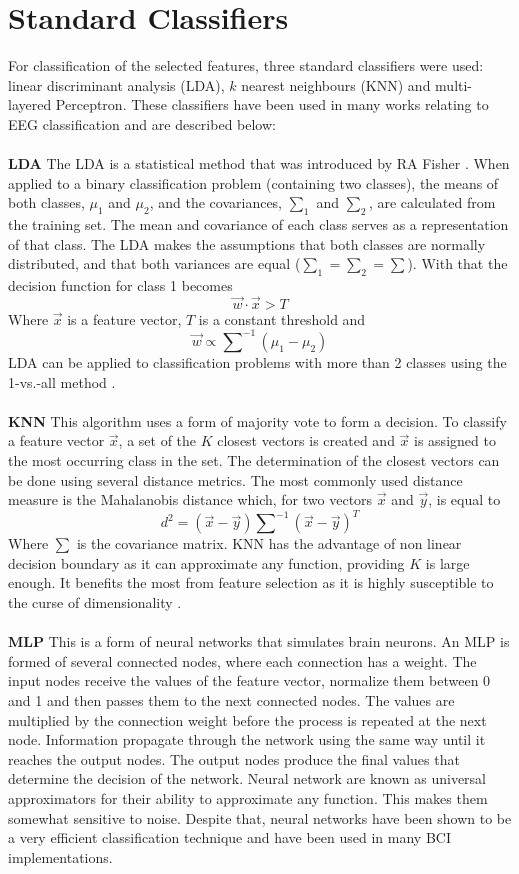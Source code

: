 \documentclass[12pt, a4paper, fleqn]{memoir}%
\begin{document}
\section{Standard Classifiers}
\label{sec:StandardClassifiers}
For classification of the selected features, three standard classifiers were used: linear discriminant analysis (LDA), $k$ nearest neighbours (KNN) and multi-layered Perceptron. These classifiers have been used in many works relating to EEG classification and are described below:\\
\\
\textbf{LDA} The LDA is a statistical method that was introduced by RA Fisher \cite{fisher1936use}. When applied to a binary classification problem (containing two classes), the means of both classes, $\mu_1$ and $\mu_2$, and the covariances, $\sum_1$ and $\sum_2$, are calculated from the training set. The mean and covariance of each class serves as a representation of that class. The LDA makes the assumptions that both classes are normally distributed, and that both variances are equal ($\sum_1 = \sum_2 = \sum$). With that the decision function for class 1 becomes 
$$\vec{w} \cdot \vec{x} > T $$
Where $\vec{x}$ is a feature vector, $T$ is a constant threshold and 
$$\vec{w} \propto \sum\nolimits^{-1}(\mu_1 - \mu_2)$$
LDA can be applied to classification problems with more than 2 classes using the 1-vs.-all method \cite{hunterberger2003brain}.\\
\\
\textbf{KNN} This algorithm uses a form of majority vote to form a decision. To classify a feature vector $\vec{x}$, a set of the $K$ closest vectors is created and $\vec{x}$ is assigned to the most occurring class in the set. The determination of the closest vectors can be done using several distance metrics. The most commonly used distance measure is the Mahalanobis distance which, for two vectors $\vec{x}$ and $\vec{y}$, is equal to
$$d^2 = (\vec{x} - \vec{y})\sum\nolimits^{-1}(\vec{x} - \vec{y})^{T}$$
Where $\sum$ is the covariance matrix. KNN has the advantage of non linear decision boundary as it can approximate any function, providing $K$ is large enough. It benefits the most from feature selection as it is highly susceptible to the curse of dimensionality \cite{lotte2007review}.\\
\\
\textbf{MLP} This is a form of neural networks that simulates brain neurons. An MLP is formed of several connected nodes, where each connection has a weight. The input nodes receive the values of the feature vector, normalize them between 0 and 1 and then passes them to the next connected nodes. The values are multiplied by the connection weight before the process is repeated at the next node. Information propagate through the network using the same way until it reaches the output nodes. The output nodes produce the final values that determine the decision of the network. Neural network are known as universal approximators for their ability to approximate any function. This makes them somewhat sensitive to noise. Despite that, neural networks have been shown to be a very efficient classification technique and have been used in many BCI implementations.\\
\end{document}
